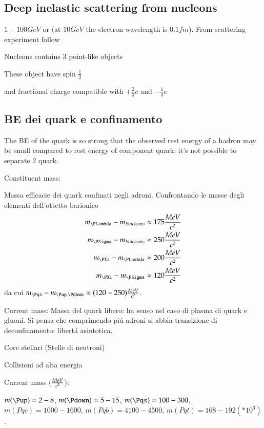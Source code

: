 \documentclass[main.tex]{subfiles}
\begin{document}
\subsection{Deep inelastic scattering from nucleons}
$1-100 GeV$ \Pelectron or \Pnu (at $10 GeV$ the electron wavelength is $0.1 fm$). From scattering experiment follow
\begin{enumerate*}
\item Nucleons contains 3 point-like objects
\item These object have spin $\frac{1}{2}$
\item and fractional charge compatible with $+\frac{2}{3}e$ and $-\frac{1}{3}e$
\end{enumerate*}

\subsection{BE dei quark e confinamento}
The BE of the quark is so strong that the observed rest energy of a hadron may be small compared to rest energy of component quark: it's not possible to separate 2 quark.

Constituent mass:

Massa efficacie dei quark confinati negli adroni. Confrontando le masse degli elementi dell'ottetto barionico 
\begin{align*}
m_{\PLambda}-m_{Nucleons}\approx 175 \Mcs \\
m_{\PSigma}-m_{Nucleons}\approx 250 \Mcs \\
m_{\PXi}-m_{\PLambda}\approx 200 \Mcs \\
m_{\PXi}-m_{\PSigma}\approx 120 \Mcs 
\end{align*}
da cui $m_{\Pqs}-m_{\Pup,\Pdown}\approx(120-250) \Mcs$.

Current mass:
Massa del quark libero: ha senso nel caso di plasma di quark e gluoni. Si pensa che comprimendo pi\'u adroni si abbia transizione di deconfinamento: libert\'a asintotica.
\begin{itemize*}
\item Core stellari (Stelle di neutroni)
\item Collisioni ad alta energia
\end{itemize*}


Current mass ($\frac{MeV}{c^2}$):

$m(\Pup)=2-8$, $m(\Pdown)=5-15$, $m(\Pqs)=100-300$, $m(Pqc)=1000-1600$, $m(Pqb)=4100-4500$, $m(Pqt)=168-192(*10^3)$.
\end{document}
